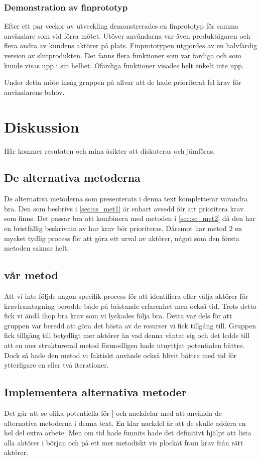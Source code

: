 \subsubsection{Demonstration av finprototyp}
Efter ett par veckor av utveckling demonstrerades en finprototyp för samma användare som vid förra mötet. Utöver användarna var även produktägaren och flera andra av kundens aktörer på plats. Finprototypen utgjordes av en halvfärdig version av slutprodukten. Det fanns flera funktioner som var färdiga och som kunde visas upp i sin helhet. Ofärdiga funktioner visades helt enkelt inte upp.

Under detta möte insåg gruppen på allvar att de hade prioriterat fel krav för användarens behov.


\section{Diskussion}
Här kommer resutaten och mina åsikter att diskuteras och jämföras.

\subsection{De alternativa metoderna}
De alternativa metoderna som presenterats i denna text kompletterar varandra bra. Den som besbrivs i \ref{sec:cs_met1} är enbart avsedd för att prioritera krav som finns. Det passar bra att kombinera med metoden i \ref{sec:sc_met2} då den har en bristfällig beskrivnin av hur krav bör prioriteras. Däremot har metod 2 en mycket tydlig process för att göra ett urval av aktörer, något som den första metoden saknar helt.

\subsection{vår metod}
Att vi inte följde någon specifik process för att identifiera eller välja aktörer för kravframtagning berodde både på bristande erfarenhet men också tid. Trots detta fick vi ändå ihop bra krav som vi lyckades följa bra. Detta var dels för att gruppen var beredd att göra det bästa av de resurser vi fick tillgång till. Gruppen fick tillgång till betydligt mer aktörer än vad denna väntat sig och det ledde till att en mer strukturerad metod förmodligen hade utnyttjat potentialen bättre. Dock så hade den metod vi faktiskt använde också blivit bättre med tid för ytterligare en eller två iterationer.

\subsection{Implementera alternativa metoder}
Det går att se olika potentiella för-] och nackdelar med att använda de alternativa metoderna i denna text. En klar nackdel är att de skulle addera en hel del extra arbete. Men om tid hade funnits hade det definitivt hjälpt att lista alla aktörer i början och på ett mer metodiskt vis plockat fram krav från rätt aktörer.

